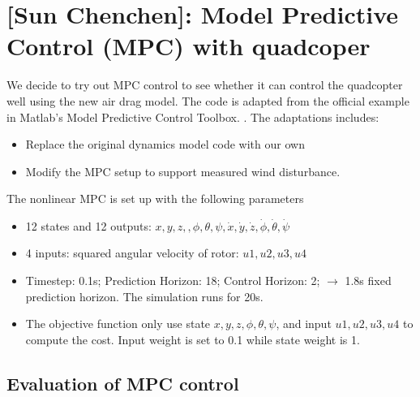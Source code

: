 \documentclass[12pt]{article}
\begin{document}
\section{[Sun Chenchen]: Model Predictive Control (MPC) with quadcoper}

We decide to try out MPC control to see whether it can control the quadcopter well using the new air drag model.
The code is adapted from the official example in Matlab's Model Predictive Control Toolbox. \cite{mathworks_quadrotor}.
The adaptations includes:

\begin{itemize}
    \item Replace the original dynamics model code with our own
    \item Modify the MPC setup to support measured wind disturbance.
\end{itemize}

\noindent The nonlinear MPC is set up with the following parameters

\begin{itemize}
    \item 12 states and 12 outputs: $x, y, z, , \phi, \theta, \psi, \dot{x}, \dot{y}, \dot{z}, \dot{\phi}, \dot{\theta}, \dot{\psi} $
    \item 4 inputs: squared angular velocity of rotor: $u1, u2, u3,u4$
    \item Timestep: 0.1s; Prediction Horizon: 18; Control Horizon: 2; $\rightarrow$ 1.8s fixed prediction horizon. The simulation runs for 20s.
    \item The objective function only use state $x, y, z, \phi, \theta, \psi$, and input $u1, u2, u3,u4$ to compute the cost. Input weight is set to 0.1 while state weight is 1.
\end{itemize}

\subsection{Evaluation of MPC control}

\end{document}
